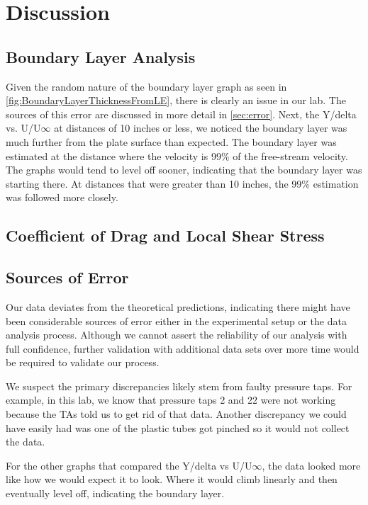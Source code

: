 \chapter{Discussion}
\label{cp:discussion}
\section{Boundary Layer Analysis}

Given the random nature of the boundary layer graph as seen in \autoref{fig:BoundaryLayerThicknessFromLE}, there is clearly an issue in our lab. The sources of this error are discussed in more detail in \autoref{sec:error}. Next, the Y/delta vs. U/U$\infty$ at distances of 10 inches or less, we noticed the boundary layer was much further from the plate surface than expected. The boundary layer was estimated at the distance where the velocity is 99\% of the free-stream velocity. The graphs would tend to level off sooner, indicating that the boundary layer was starting there. At distances that were greater than 10 inches, the 99\% estimation was followed more closely. 

\section{Coefficient of Drag and Local Shear Stress}


\section{Sources of Error} \label{sec:error}

Our data deviates from the theoretical predictions, indicating there might have been considerable sources of error either in the experimental setup or the data analysis process. Although we cannot assert the reliability of our analysis with full confidence, further validation with additional data sets over more time would be required to validate our process.

We suspect the primary discrepancies likely stem from faulty pressure taps. For example, in this lab, we know that pressure taps 2 and 22 were not working because the TAs told us to get rid of that data. Another discrepancy we could have easily had was one of the plastic tubes got pinched so it would not collect the data.
 
For the other graphs that compared the Y/delta vs U/U$\infty$, the data looked more like how we would expect it to look. Where it would climb linearly and then eventually level off, indicating the boundary layer. 

